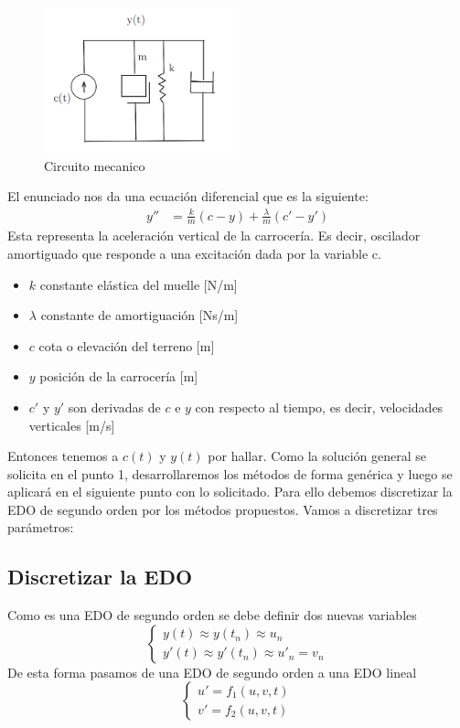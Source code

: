 \begin{figure}[h] 
    \centering
    \includegraphics[width=0.5\textwidth]{imagenes/circuito.png}
    \caption{Circuito mecanico}
    \label{fig:mi_figura}
\end{figure}
El enunciado nos da una ecuación diferencial que es la siguiente:
\begin{align}
    y'' &= \frac{k}{m}(c - y) + \frac{\lambda}{m}(c' - y')
\end{align}
Esta representa la aceleración vertical de la carrocería. Es decir, oscilador amortiguado que responde a una excitación dada por la variable c.
\begin{itemize}
    \item \( k \) constante elástica del muelle [N/m]
    \item \( \lambda \) constante de amortiguación [Ns/m]
    \item \( c \) cota o elevación del terreno [m]
    \item \( y \) posición de la carrocería [m]
    \item \( c' \) y \( y' \) son derivadas de \( c \) e \( y \) con respecto al tiempo, es decir, velocidades verticales [m/s]
\end{itemize}
Entonces tenemos a \(c(t)\) y \(y(t)\) por hallar.
Como la solución general se solicita en el punto 1, desarrollaremos los métodos de forma genérica y luego se aplicará en el siguiente punto con lo solicitado.
Para ello debemos discretizar la EDO de segundo orden por los métodos propuestos.
Vamos a discretizar tres parámetros:
\subsection{Discretizar la EDO}
Como es una EDO de segundo orden se debe definir dos nuevas variables
\[
\begin{cases}
    y(t) \approx y(t_n) \approx u_n \\
    y'(t) \approx y'(t_n) \approx u'_n = v_n 
\end{cases}
\]
De esta forma pasamos de una EDO de segundo orden a una EDO lineal
\[
\begin{cases}
    u' = f_1(u,v,t) \\
    v' = f_2(u,v,t)
\end{cases}
\]
